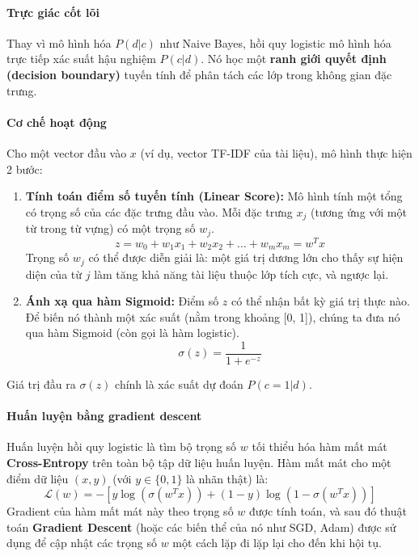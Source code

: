 \paragraph{Trực giác cốt lõi}
Thay vì mô hình hóa $P(d|c)$ như Naive Bayes, hồi quy logistic mô hình hóa trực tiếp xác suất hậu nghiệm $P(c|d)$. Nó học một \textbf{ranh giới quyết định (decision boundary)} tuyến tính để phân tách các lớp trong không gian đặc trưng.

\begin{center}
    \label{fig:logistic_regression_boundary}
\end{center}

\paragraph{Cơ chế hoạt động}
Cho một vector đầu vào $x$ (ví dụ, vector TF-IDF của tài liệu), mô hình thực hiện 2 bước:
\begin{enumerate}
    \item \textbf{Tính toán điểm số tuyến tính (Linear Score):} Mô hình tính một tổng có trọng số của các đặc trưng đầu vào. Mỗi đặc trưng $x_j$ (tương ứng với một từ trong từ vựng) có một trọng số $w_j$.
    $$ z = w_0 + w_1 x_1 + w_2 x_2 + \dots + w_m x_m = w^T x $$
    Trọng số $w_j$ có thể được diễn giải là: một giá trị dương lớn cho thấy sự hiện diện của từ $j$ làm tăng khả năng tài liệu thuộc lớp tích cực, và ngược lại.
    \item \textbf{Ánh xạ qua hàm Sigmoid:} Điểm số $z$ có thể nhận bất kỳ giá trị thực nào. Để biến nó thành một xác suất (nằm trong khoảng [0, 1]), chúng ta đưa nó qua hàm Sigmoid (còn gọi là hàm logistic).
    $$ \sigma(z) = \frac{1}{1 + e^{-z}} $$
\end{enumerate}
Giá trị đầu ra $\sigma(z)$ chính là xác suất dự đoán $P(c=1|d)$.
\paragraph{Huấn luyện bằng gradient descent}
Huấn luyện hồi quy logistic là tìm bộ trọng số $w$ tối thiểu hóa hàm mất mát \textbf{Cross-Entropy} trên toàn bộ tập dữ liệu huấn luyện. Hàm mất mát cho một điểm dữ liệu $(x, y)$ (với $y \in \{0, 1\}$ là nhãn thật) là:
$$ \mathcal{L}(w) = -[y \log(\sigma(w^T x)) + (1-y) \log(1 - \sigma(w^T x))] $$
Gradient của hàm mất mát này theo trọng số $w$ được tính toán, và sau đó thuật toán \textbf{Gradient Descent} (hoặc các biến thể của nó như SGD, Adam) được sử dụng để cập nhật các trọng số $w$ một cách lặp đi lặp lại cho đến khi hội tụ.

